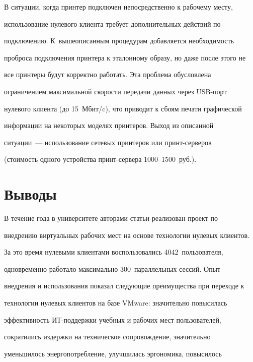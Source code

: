   В ситуации, когда принтер подключен непосредственно к рабочему месту, 

использование нулевого клиента требует дополнительных действий по 

подключению. К~вышеописанным процедурам добавляется необходимость 

проброса подключения принтера к эталонному образу, но даже после этого не 

все принтеры будут корректно работать. Эта проблема обусловлена 

ограничением максимальной скорости передачи данных через USB-порт 

нулевого клиента (до 15~Мбит/c), что приводит к сбоям печати графической 

информации на некоторых моделях принтеров. Выход из описанной 

  ситуации~--- использование сетевых принтеров или принт-сер\-ве\-ров 

(стоимость одного устройства принт-сер\-ве\-ра 1000--1500~руб.).



\vspace*{-4pt}

  

\section{Выводы}



\vspace*{-2pt}



  В течение года в университете авторами статьи реализован проект по 

внед\-ре\-нию виртуальных рабочих мест на основе технологии нулевых клиентов. 

За это время нулевыми клиентами воспользовались 4042~пользователя, 

одновременно работало максимально 300~параллельных сессий. Опыт 

внедрения и использования показал следующие преимущества при переходе к 

технологии нулевых клиентов на базе VMware: значительно повысилась 

эффективность ИТ-под\-держ\-ки учебных и рабочих мест пользователей, 

сократились издержки на техническое сопровождение, значительно 

уменьшилось энергопотребление, улучшилась эргономика, повысилось 

